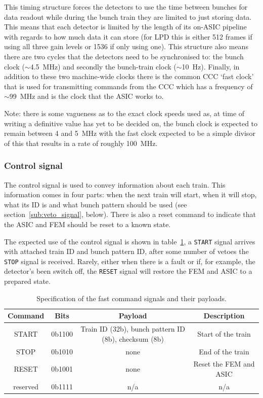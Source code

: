 This timing structure forces the detectors to use the time between bunches for data readout while during the bunch train they are limited to just storing data. This means that each detector is limited by the length of its on-ASIC pipeline with regards to how much data it can store (for LPD this is either 512 frames if using all three gain levels or 1536 if only using one). This structure also means there are two cycles that the detectors need to be synchronised to: the bunch clock (\(\sim\)4.5~MHz) and secondly the bunch-train clock (\(\sim\)10~Hz). Finally, in addition to these two machine-wide clocks there is the common CCC `fast clock' that is used for transmitting commands from the CCC which has a frequency of \(\sim\)99~MHz and is the clock that the ASIC works to.

Note: there is some vagueness as to the exact clock speeds used as, at time of writing a definitive value has yet to be decided on, the bunch clock is expected to remain between 4 and 5~MHz with the fast clock expected to be a simple divisor of this that results in a rate of roughly 100~MHz. 
\subsubsection{Control signal} %
\label{sub:control_signal}
The control signal is used to convey information about each train. This information comes in four parts: when the next train will start, when it will stop, what its ID is and what bunch pattern should be used (see section~\ref{sub:veto_signal}, below). There is also a reset command to indicate that the ASIC and FEM should be reset to a known state. 

The expected use of the control signal is shown in table~\ref{tab:fast_commands}, a \texttt{START} signal arrives with attached train ID and bunch pattern ID, after some number of vetoes the \texttt{STOP} signal is received. Rarely, either when there is a fault or if, for example, the detector's been switch off, the \texttt{RESET} signal will restore the FEM and ASIC to a prepared state.
\begin{table}
  \begin{center}
  \begin{tabular}{c | c | c | c}
    Command  & Bits   & Payload & Description \\
    \hline   
    START    & 0b1100 & Train ID (32b), bunch pattern ID (8b), checksum (8b) & Start of the train \\
    STOP     & 0b1010 & none                                                 & End of the train \\
    RESET    & 0b1001 & none                                                 & Reset the FEM and ASIC \\
    reserved & 0b1111 & n/a                                                  & n/a\\
  \end{tabular}
  \end{center}
  \caption{Specification of the fast command signals and their payloads.}
  \label{tab:fast_commands}
\end{table}
